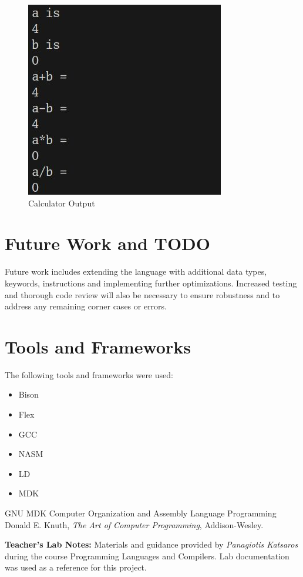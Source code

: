 \documentclass{article}
\begin{document}
    \begin{figure} [h]
        \centering
        \includegraphics[width=0.35\linewidth]{assets/results/calculator.png}
        \caption{Calculator Output}
        \label{fig:enter-label}
    \end{figure}

\appendix
\section{Future Work and TODO}
Future work includes extending the language with additional data types, keywords, instructions and implementing further optimizations. Increased testing and thorough code review will also be necessary to ensure robustness and to address any remaining corner cases or errors.

\section{Tools and Frameworks}
The following tools and frameworks were used:
\begin{itemize}
  \item Bison
  \item Flex
  \item GCC
  \item NASM
  \item LD
  \item MDK
\end{itemize}

\begin{thebibliography}{9}
    GNU MDK
        Computer Organization and Assembly Language Programming
    Donald E. Knuth, \textit{The Art of Computer Programming}, Addison-Wesley.
\end{thebibliography}
\vspace{1em}
\noindent\textbf{Teacher's Lab Notes:} Materials and guidance provided by \textit{Panagiotis Katsaros} during the course Programming Languages and Compilers. Lab documentation was used as a reference for this project.
\end{document}
